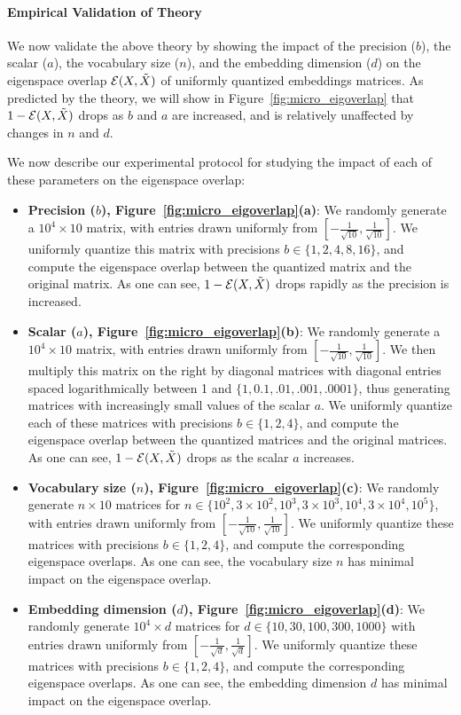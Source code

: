 \paragraph{Empirical Validation of Theory}
We now validate the above theory by showing the impact of the precision ($b$), the scalar ($a$), the vocabulary size ($n$), and the embedding dimension ($d$) on the eigenspace overlap $\eigover(X,\tX)$ of uniformly quantized embeddings matrices.
As predicted by the theory, we will show in Figure~\ref{fig:micro_eigoverlap} that $1-\eigover(X,\tX)$ drops as $b$ and $a$ are increased, and is relatively unaffected by changes in $n$ and $d$.

We now describe our experimental protocol for studying the impact of each of these parameters on the eigenspace overlap:
\begin{itemize}
	\item \textbf{Precision ($b$), Figure~\ref{fig:micro_eigoverlap}(a)}: We randomly generate a $10^4 \times 10$ matrix, with entries drawn uniformly from $[-\frac{1}{\sqrt{10}},\frac{1}{\sqrt{10}}]$. 
	We uniformly quantize this matrix with precisions $b \in \{1,2,4,8,16\}$, and compute the eigenspace overlap between the quantized matrix and the original matrix.
	As one can see, $1-\eigover(X,\tX)$ drops rapidly as the precision is increased.
	\item \textbf{Scalar ($a$), Figure~\ref{fig:micro_eigoverlap}(b)}: We randomly generate a $10^4 \times 10$ matrix, with entries drawn uniformly from $[-\frac{1}{\sqrt{10}},\frac{1}{\sqrt{10}}]$.
	We then multiply this matrix on the right by diagonal matrices with diagonal entries spaced logarithmically between 1 and $\{1, 0.1,.01,.001,.0001\}$, thus generating matrices with increasingly small values of the scalar $a$.
	We uniformly quantize each of these matrices with precisions $b \in \{1,2,4\}$, and compute the eigenspace overlap between the quantized matrices and the original matrices.
	As one can see, $1-\eigover(X,\tX)$ drops as the scalar $a$ increases.
	\item \textbf{Vocabulary size ($n$), Figure~\ref{fig:micro_eigoverlap}(c)}: We randomly generate $n \times 10$ matrices for $n \in \{10^2, 3\times 10^2, 10^3, 3\times 10^3,10^4, 3\times 10^4,10^5\}$, with entries drawn uniformly from $[-\frac{1}{\sqrt{10}},\frac{1}{\sqrt{10}}]$.
	We uniformly quantize these matrices with precisions $b \in \{1,2,4\}$, and compute the corresponding eigenspace overlaps.
	As one can see, the vocabulary size $n$ has minimal impact on the eigenspace overlap.
	\item \textbf{Embedding dimension ($d$), Figure~\ref{fig:micro_eigoverlap}(d)}: We randomly generate $10^4 \times d$ matrices for $d \in \{10,30,100,300,1000\}$ with entries drawn uniformly from $[-\frac{1}{\sqrt{d}},\frac{1}{\sqrt{d}}]$.
	We uniformly quantize these matrices with precisions $b \in \{1,2,4\}$, and compute the corresponding eigenspace overlaps.
	As one can see, the embedding dimension $d$ has minimal impact on the eigenspace overlap.
\end{itemize}

